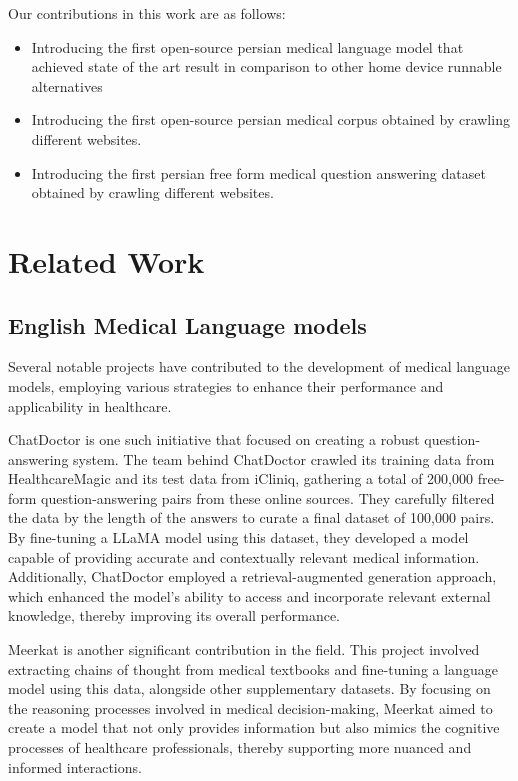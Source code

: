 \documentclass[conference]{IEEEtran}
\begin{document}
Our contributions in this work are as follows:
\begin{itemize}
	\item Introducing the first open-source persian medical language model that achieved state of the art result in
	comparison to other home device runnable alternatives
	\item Introducing the first open-source persian medical corpus obtained by crawling different websites.
	\item  Introducing the first persian free form medical question answering dataset obtained by crawling different websites.
\end{itemize}

\section{Related Work}

\subsection{English Medical Language models}
Several notable projects have contributed to the development of medical language models, employing various strategies to enhance their performance and applicability in healthcare.

ChatDoctor
\cite{b6}
is one such initiative that focused on creating a robust question-answering system. The team behind ChatDoctor crawled its training data from HealthcareMagic and its test data from iCliniq, gathering a total of 200,000 free-form question-answering pairs from these online sources. They carefully filtered the data by the length of the answers to curate a final dataset of 100,000 pairs. By fine-tuning a LLaMA model
\cite{b7}
using this dataset, they developed a model capable of providing accurate and contextually relevant medical information. Additionally, ChatDoctor employed a retrieval-augmented generation approach, which enhanced the model’s ability to access and incorporate relevant external knowledge, thereby improving its overall performance.

Meerkat
\cite{b8}
is another significant contribution in the field. This project involved extracting chains of thought from medical textbooks and fine-tuning a language model using this data, alongside other supplementary datasets. By focusing on the reasoning processes involved in medical decision-making, Meerkat aimed to create a model that not only provides information but also mimics the cognitive processes of healthcare professionals, thereby supporting more nuanced and informed interactions.
\end{document}
